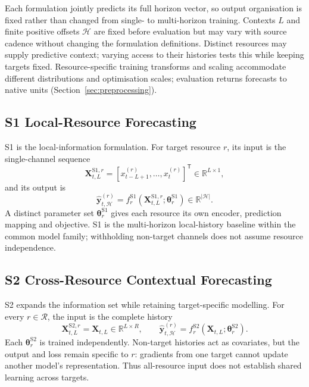 \documentclass[5p,twocolumn]{elsarticle}
\begin{document}
Each formulation jointly predicts its full horizon vector, so output
organisation is fixed rather than changed from single- to multi-horizon
training. Contexts $L$ and finite positive offsets $\mathcal{H}$ are fixed
before evaluation but may vary with source cadence without changing the
formulation definitions. Distinct resources may supply predictive context;
varying access to their histories tests this while keeping targets fixed.
Resource-specific training transforms and scaling accommodate different
distributions and optimisation scales; evaluation returns forecasts to native
units (Section~\ref{sec:preprocessing}).

\subsection{S1 Local-Resource Forecasting}
\label{sec:s1}

S1 is the local-information formulation. For target resource $r$, its input is
the single-channel sequence
\begin{equation}
  \mathbf{X}_{t,L}^{\mathrm{S1},r}
  = [x_{t-L+1}^{(r)},\ldots,x_t^{(r)}]^{\mathsf T}
  \in\mathbb{R}^{L\times 1},
  \label{eq:s1-input}
\end{equation}
and its output is
\begin{equation}
  \widehat{\mathbf{y}}_{t,\mathcal{H}}^{(r)}
  = f_r^{\mathrm{S1}}
    (\mathbf{X}_{t,L}^{\mathrm{S1},r};\boldsymbol{\theta}_r^{\mathrm{S1}})
  \in\mathbb{R}^{|\mathcal{H}|}.
  \label{eq:s1-forecast}
\end{equation}
A distinct parameter set $\boldsymbol{\theta}_r^{\mathrm{S1}}$ gives each
resource its own encoder, prediction mapping and objective. S1 is the
multi-horizon local-history baseline within the common model family;
withholding non-target channels does not assume resource independence.

\subsection{S2 Cross-Resource Contextual Forecasting}
\label{sec:s2}

S2 expands the information set while retaining target-specific modelling. For
every $r\in\mathcal{R}$, the input is the complete history
\begin{equation}
  \mathbf{X}_{t,L}^{\mathrm{S2},r}=\mathbf{X}_{t,L}
  \in\mathbb{R}^{L\times R},
  \qquad
  \widehat{\mathbf{y}}_{t,\mathcal{H}}^{(r)}
  = f_r^{\mathrm{S2}}
    (\mathbf{X}_{t,L};\boldsymbol{\theta}_r^{\mathrm{S2}}).
  \label{eq:s2-forecast}
\end{equation}
Each $\boldsymbol{\theta}_r^{\mathrm{S2}}$ is trained independently.
Non-target histories act as covariates, but the output and loss remain
specific to $r$: gradients from one target cannot update another model's
representation. Thus all-resource input does not establish shared learning
across targets.
\end{document}
